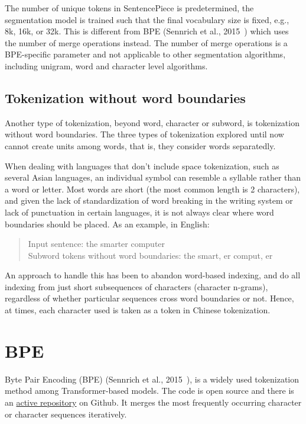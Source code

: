The number of unique tokens in SentencePiece is predetermined, the segmentation model is trained such that the final vocabulary size is fixed, e.g., 8k, 16k, or 32k. This is different from BPE (Sennrich et al., 2015~\cite{sennrich2015neural}) which uses the number of merge operations instead. The number of merge operations is a BPE-specific parameter and not applicable to other segmentation algorithms, including unigram, word and character level algorithms.

\subsection{Tokenization without word boundaries}\label{subsec:wordtokwowb}

Another type of tokenization, beyond word, character or subword, is tokenization without word boundaries. The three types of tokenization explored until now cannot create units among words, that is, they consider words separatedly.

When dealing with languages that don't include space tokenization, such as several Asian languages, an individual symbol can resemble a syllable rather than a word or letter. Most words are short (the most common length is 2 characters), and given the lack of standardization of word breaking in the writing system or lack of punctuation in certain languages, it is not always clear where word boundaries should be placed. As an example, in English:

\begin{quote}
    Input sentence: the smarter computer\\
    Subword tokens without word boundaries: the smart, er comput, er
\end{quote}

An approach to handle this has been to abandon word-based indexing, and do all indexing from just short subsequences of characters (character n-grams), regardless of whether particular sequences cross word boundaries or not. Hence, at times, each character used is taken as a token in Chinese tokenization.

\section{BPE}

Byte Pair Encoding (BPE) (Sennrich et al., 2015~\cite{sennrich2015neural}), is a widely used tokenization method among Transformer-based models. The code is open source and there is an \href{https://github.com/rsennrich/subword-nmt}{active repository} on Github. It merges the most frequently occurring character or character sequences iteratively.

